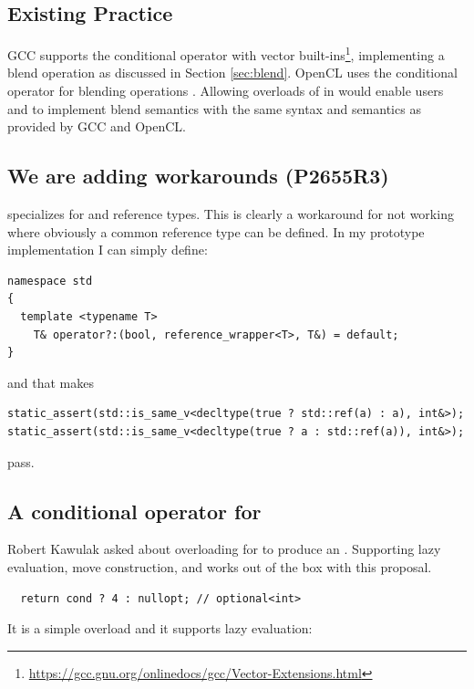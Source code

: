 \subsection{Existing Practice}
GCC supports the conditional operator with vector built-ins\footnote{\url{https://gcc.gnu.org/onlinedocs/gcc/Vector-Extensions.html}}, implementing a blend operation as discussed in Section \ref{sec:blend}.
OpenCL uses the conditional operator for blending operations \cite{spec.opencl1.1}.
Allowing overloads of  in \CC{} would enable users and  to implement blend semantics with the same syntax and semantics as provided by GCC and OpenCL.

\subsection{We are adding workarounds (P2655R3)}

\textcite{P2655R3} specializes  for  and reference types.
This is clearly a workaround for  not working where obviously a common reference type can be defined.
In my prototype implementation I can simply define:
\medskip\begin{lstlisting}
namespace std
{
  template <typename T>
    T& operator?:(bool, reference_wrapper<T>, T&) = default;
}
\end{lstlisting}
and that makes
\medskip\begin{lstlisting}
static_assert(std::is_same_v<decltype(true ? std::ref(a) : a), int&>);
static_assert(std::is_same_v<decltype(true ? a : std::ref(a)), int&>);
\end{lstlisting}
pass.

\subsection{A conditional operator for }

Robert Kawulak asked about overloading  for
 to produce an .
Supporting lazy evaluation, move construction, and  works
out of the box with this proposal.

\medskip\begin{lstlisting}
  return cond ? 4 : nullopt; // optional<int>
\end{lstlisting}

It is a simple  overload and it supports lazy evaluation:

